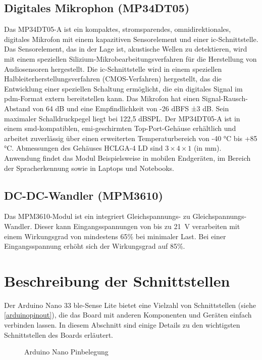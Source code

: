 \subsection{Digitales Mikrophon (MP34DT05)}
Das MP34DT05-A ist ein kompaktes, stromsparendes, omnidirektionales, digitales
Mikrofon mit einem kapazitiven Sensorelement und einer \ac{ic}-Schnittstelle.
Das Sensorelement, das in der Lage ist, akustische Wellen zu detektieren, wird mit einem speziellen Silizium-Mikrobearbeitungsverfahren für die Herstellung von
Audiosensoren hergestellt. Die \ac{ic}-Schnittstelle wird in einem speziellen Halbleiterherstellungsverfahren (CMOS-Verfahren\cite{Gehrke.2022}\cite{Bernstein.2020}) hergestellt, das die Entwicklung einer speziellen Schaltung ermöglicht, die ein digitales Signal im \ac{pdm}-Format extern bereitstellen kann. Das Mikrofon hat einen Signal-Rausch-Abstand von 64 dB und eine Empfindlichkeit von -26 dBFS ±3 dB. Sein maximaler Schalldruckpegel liegt bei 122,5 dBSPL. Der MP34DT05-A ist in einem \ac{smd}-kompatiblen, \ac{emi}-geschirmten Top-Port-Gehäuse erhältlich und arbeitet zuverlässig über einen erweiterten Temperaturbereich von -40 °C bis +85 °C. Abmessungen des Gehäuses HCLGA-4 LD sind $3\times 4 \times 1$ (in mm). Anwendung findet das Modul Beispielsweise in mobilen Endgeräten, im Bereich der Spracherkennung sowie in Laptops und Notebooks.\cite{STM3.2021}\cite{Ard.2024}

\subsection{DC-DC-Wandler (MPM3610)}
Das MPM3610-Modul ist ein integriert Gleichspannungs- zu Gleichspannungs-Wandler. Dieser kann Eingangsspannungen von bis zu 21\ V verarbeiten mit einem Wirkungsgrad von mindestens 65\% bei minimaler Last. Bei einer Eingangsspannung erhöht sich der Wirkungsgrad auf 85\%.\cite{Ard.2024}

\section{Beschreibung der Schnittstellen}
Der Arduino Nano 33 \ac{ble}-Sense Lite bietet eine Vielzahl von Schnittstellen (siehe \autoref{arduinopinout}), die das Board mit anderen Komponenten und Geräten einfach verbinden lassen. In diesem Abschnitt sind einige Details zu den wichtigsten Schnittstellen des Boards erläutert.

	\begin{figure}
		
		\caption{Arduino Nano Pinbelegung \cite{Ard.2024}}
		\label{arduinopinout}
	\end{figure}

